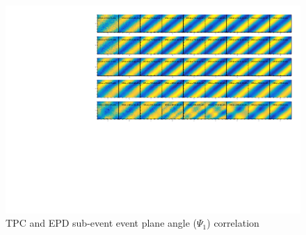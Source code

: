 \begin{figure}[ht]
\includegraphics[scale=0.6]{chapter2/fig/epd_tpc_psi1_cor.pdf}
\caption{TPC and EPD sub-event event plane angle ($\Psi_{1}$) correlation}
\label{fig:epd_tpc_psi1_cor} 
\end{figure}


\newpage

